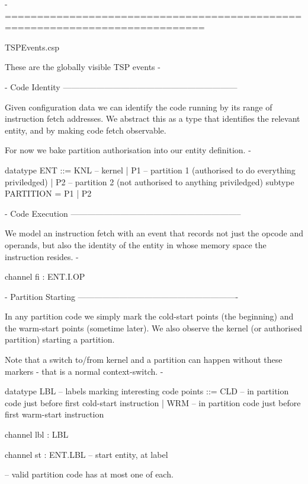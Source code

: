 {- =============================================================================

	TSPEvents.csp

 These are the globally visible TSP events
-}


{- Code Identity ---------------------------------------------------------------

  Given configuration data we can identify the code running
  by its range of instruction fetch addresses.
  We abstract this as a type that identifies the relevant entity,
  and by making code fetch observable.

  For now we bake partition authorisation into our entity definition.
-}
\begin{circus}
datatype ENT ::=
  KNL  -- kernel
 | P1   -- partition 1 (authorised to do everything priviledged)
 | P2   -- partition 2 (not authorised to anything priviledged)
subtype PARTITION = P1 | P2
\begin{circus}

{- Code Execution --------------------------------------------------------------

  We model an instruction fetch with an event that records not just the opcode
  and operands, but also the identity of the entity in whose memory space the
  instruction resides.
-}
\begin{circus}

channel fi : ENT.I.OP
\begin{circus}

{- Partition Starting ----------------------------------------------------------

  In any partition code we simply mark the cold-start points (the beginning)
  and the warm-start points (sometime later).
  We also observe the kernel (or authorised partition) starting a partition.

  Note that a switch to/from kernel and a partition can happen without these
  markers - that is a normal context-switch.
-}
\begin{circus}

datatype LBL  -- labels marking interesting code points
  ::= CLD   -- in partition code just before first cold-start instruction
  | WRM   -- in partition code just before first warm-start instruction
\end{circus}

channel lbl : LBL
\begin{circus}

channel st : ENT.LBL  -- start entity, at label
\end{circus}
-- valid partition code has at most one of each.


\end{circus}
\end{circus}
\end{circus}
\end{circus}
